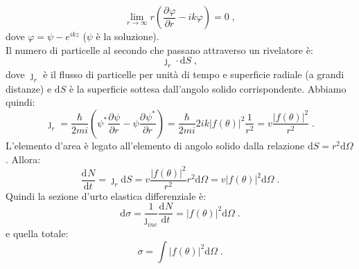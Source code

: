 \documentclass[10pt,a4paper]{report}
\theoremstyle{definition}
\newcommand{\pdev}[3][]{\frac{\partial^{#1} #2}{\partial #3^{#1}}}
\newcommand{\dev}[3][]{\frac{\mathrm{d}^{#1} #2}{\mathrm{d} #3^{#1}}}
\numberwithin{equation}{section}
\newcommand{\diff}[1][]{\mathrm{d}#1}
\begin{document}
\begin{equation}
\lim_{r\to\infty} r\left(\pdev{\varphi}{r}-ik\varphi\right)=0\;,
\end{equation}
dove $\varphi=\psi-e^{ikz}$ ($\psi$ è la soluzione). \\
Il numero di particelle al secondo che passano attraverso un rivelatore è:
\begin{equation}
\jmath_r\cdot \diff{S}\;,
\end{equation}
dove $\jmath_r$ è il flusso di particelle per unità di tempo e superficie radiale (a grandi distanze) e $\diff{S}$ è la superficie sottesa dall'angolo solido corrispondente. Abbiamo quindi:
\begin{equation}
\jmath_r=\frac{\hbar}{2mi}\left(\psi^*\pdev{\psi}{r}-\psi\pdev{\psi^*}{r}\right)=\frac{\hbar}{2mi}2ik|f(\theta)|^2\frac{1}{r^2}=v\frac{|f(\theta)|^2}{r^2}\;.
\end{equation}
L'elemento d'area è legato all'elemento di angolo solido dalla relazione $\diff{S}=r^2\diff{\Omega}$. Allora:
\begin{equation}
\dev{N}{t}=\jmath_r\diff{S}=v\frac{|f(\theta)|^2}{r^2}r^2\diff{\Omega}=v|f(\theta)|^2\diff{\Omega}\;.
\end{equation}
Quindi la sezione d'urto elastica differenziale è:
\begin{equation}
\diff{\sigma}=\frac{1}{\jmath_{inc}}\dev{N}{t}=|f(\theta)|^2\diff{\Omega}\;.
\end{equation}
e quella totale:
\begin{equation}
\sigma=\int |f(\theta)|^2\diff{\Omega}\;.
\end{equation}
\end{document}
